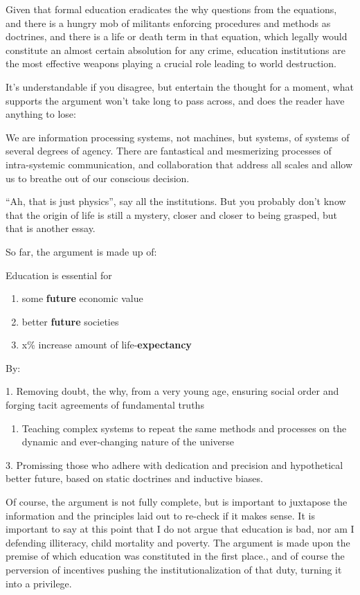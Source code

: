 \documentclass[
  letterpaper,
  DIV=11,
  numbers=noendperiod,
  oneside]{scrartcl}
\providecommand{\tightlist}{%
  \setlength{\itemsep}{0pt}\setlength{\parskip}{0pt}}\usepackage{longtable,booktabs,array}
\begin{document}
Given that formal education eradicates the why questions from the
equations, and there is a hungry mob of militants enforcing procedures
and methods as doctrines, and there is a life or death term in that
equation, which legally would constitute an almost certain absolution
for any crime, education institutions are the most effective weapons
playing a crucial role leading to world destruction.

It's understandable if you disagree, but entertain the thought for a
moment, what supports the argument won't take long to pass across, and
does the reader have anything to lose:

We are information processing systems, not machines, but systems, of
systems of several degrees of agency. There are fantastical and
mesmerizing processes of intra-systemic communication, and collaboration
that address all scales and allow us to breathe out of our conscious
decision.

``Ah, that is just physics'', say all the institutions. But you probably
don't know that the origin of life is still a mystery, closer and closer
to being grasped, but that is another essay.

So far, the argument is made up of:

Education is essential for

\begin{enumerate}
\def\labelenumi{\arabic{enumi}.}
\item
  some \textbf{future} economic value
\item
  better \textbf{future} societies
\item
  x\% increase amount of life-\textbf{expectancy}
\end{enumerate}

By:

1. Removing doubt, the why, from a very young age, ensuring social order
and forging tacit agreements of fundamental truths

\begin{enumerate}
\def\labelenumi{\arabic{enumi}.}
\setcounter{enumi}{1}
\tightlist
\item
  Teaching complex systems to repeat the same methods and processes on
  the dynamic and ever-changing nature of the universe
\end{enumerate}

3. Promissing those who adhere with dedication and precision and
hypothetical better future, based on static doctrines and inductive
biases.

Of course, the argument is not fully complete, but is important to
juxtapose the information and the principles laid out to re-check if it
makes sense. It is important to say at this point that I do not argue
that education is bad, nor am I defending illiteracy, child mortality
and poverty. The argument is made upon the premise of which education
was constituted in the first place., and of course the perversion of
incentives pushing the institutionalization of that duty, turning it
into a privilege.
\end{document}
